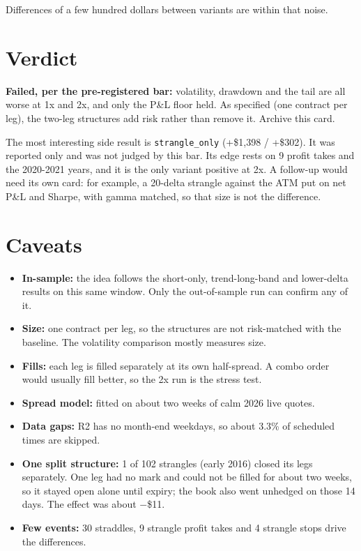 \documentclass{article}
\begin{document}
Differences of a few hundred dollars between variants are within that noise.

\section{Verdict}

\textbf{Failed, per the pre-registered bar:} volatility, drawdown and the tail are all worse at 1x and 2x, and only the P\&L floor held. As specified (one contract per leg), the two-leg structures add risk rather than remove it. Archive this card.

The most interesting side result is \texttt{strangle\_\allowbreak{}only} (+\$1,398 /\allowbreak{} +\$302). It was reported only and was not judged by this bar. Its edge rests on 9 profit takes and the 2020-2021 years, and it is the only variant positive at 2x. A follow-up would need its own card: for example, a 20-delta strangle against the ATM put on net P\&L and Sharpe, with gamma matched, so that size is not the difference.

\section{Caveats}

\begin{itemize}

\item \textbf{In-sample:} the idea follows the short-only, trend-long-band and lower-delta results on this same window. Only the out-of-sample run can confirm any of it.

\item \textbf{Size:} one contract per leg, so the structures are not risk-matched with the baseline. The volatility comparison mostly measures size.

\item \textbf{Fills:} each leg is filled separately at its own half-spread. A combo order would usually fill better, so the 2x run is the stress test.

\item \textbf{Spread model:} fitted on about two weeks of calm 2026 live quotes.

\item \textbf{Data gaps:} R2 has no month-end weekdays, so about 3.3\% of scheduled times are skipped.

\item \textbf{One split structure:} 1 of 102 strangles (early 2016) closed its legs separately. One leg had no mark and could not be filled for about two weeks, so it stayed open alone until expiry; the book also went unhedged on those 14 days. The effect was about \ensuremath{-}\$11.

\item \textbf{Few events:} 30 straddles, 9 strangle profit takes and 4 strangle stops drive the differences.

\end{itemize}
\end{document}
